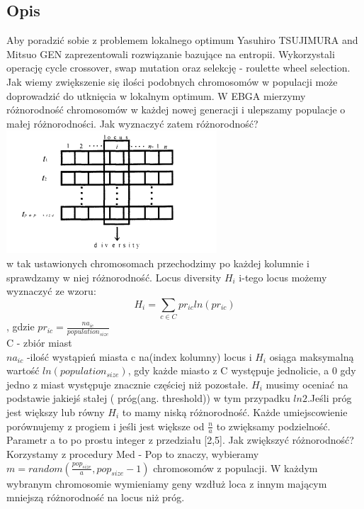\documentclass[11pt]{article}
\begin{document}
\subsection{Opis}
Aby poradzić sobie z problemem lokalnego optimum Yasuhiro TSUJIMURA and Mitsuo GEN zaprezentowali rozwiązanie bazujące na entropii. Wykorzystali operację cycle crossover, swap mutation oraz selekcję - roulette wheel selection. Jak wiemy zwiększenie się ilości podobnych chromosomów w populacji może doprowadzić do utknięcia w lokalnym optimum. W EBGA mierzymy różnorodność chromosomów w każdej nowej generacji i ulepszamy populacje o małej różnorodności. Jak wyznaczyć zatem różnorodność? \\
\centering
\includegraphics[scale=.7]{locus.png}\\
\flushleft
w tak ustawionych chromosomach przechodzimy po każdej kolumnie i sprawdzamy w niej różnorodność. Locus diversity $H_i$ i-tego locus możemy wyznaczyć ze wzoru:
$$H_i= \sum_{c \in C}pr_{ic}ln(pr_{ic})$$, gdzie
$pr_{ic}=\frac{na_{ic}}{population_{size}}$\\
C - zbiór miast\\
$ na_{ic}$ -ilość wystąpień miasta c na(index kolumny) locus i 
$ H_i $ osiąga maksymalną wartość $ln(population_{size})$, gdy każde miasto z C występuje jednolicie, a 0 gdy jedno z miast występuje znacznie częściej niż pozostałe. $H_i$ musimy oceniać na podstawie jakiejś stałej ( próg(ang. threshold)) w tym przypadku $ln2$.Jeśli próg jest większy lub równy $H_i$ to mamy niską różnorodność. Każde umiejscowienie porównujemy z progiem i jeśli jest większe od 
$\frac{n}{a}$ to zwięksamy podzielność. Parametr a to po prostu integer z przedziału [2,5]. Jak zwiększyć różnorodność? Korzystamy z procedury Med - Pop to znaczy, wybieramy $m=random(\frac{pop_{size}}{a},pop_{size}-1)$ chromosomów z populacji. W każdym wybranym chromosomie wymieniamy geny wzdłuż loca z innym mającym mniejszą różnorodność na locus niż próg.
\end{document}
